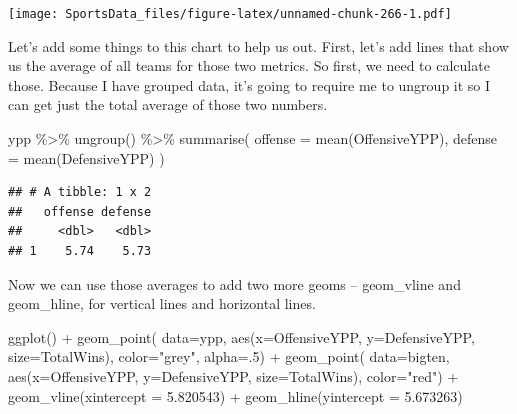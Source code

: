 \documentclass[
]{book}
\newenvironment{Shaded}{\begin{snugshade}}{\end{snugshade}}
\newcommand{\AttributeTok}[1]{\textcolor[rgb]{0.77,0.63,0.00}{#1}}
\newcommand{\DecValTok}[1]{\textcolor[rgb]{0.00,0.00,0.81}{#1}}
\newcommand{\FloatTok}[1]{\textcolor[rgb]{0.00,0.00,0.81}{#1}}
\newcommand{\FunctionTok}[1]{\textcolor[rgb]{0.00,0.00,0.00}{#1}}
\newcommand{\NormalTok}[1]{#1}
\newcommand{\SpecialCharTok}[1]{\textcolor[rgb]{0.00,0.00,0.00}{#1}}
\newcommand{\StringTok}[1]{\textcolor[rgb]{0.31,0.60,0.02}{#1}}
\begin{document}
\texttt{[image: SportsData\_files/figure-latex/unnamed-chunk-266-1.pdf]}

Let's add some things to this chart to help us out. First, let's add lines that show us the average of all teams for those two metrics. So first, we need to calculate those. Because I have grouped data, it's going to require me to ungroup it so I can get just the total average of those two numbers.

\begin{Shaded}
\begin{Highlighting}[]
\NormalTok{ypp }\SpecialCharTok{\%\textgreater{}\%} 
  \FunctionTok{ungroup}\NormalTok{() }\SpecialCharTok{\%\textgreater{}\%} 
  \FunctionTok{summarise}\NormalTok{(}
    \AttributeTok{offense =} \FunctionTok{mean}\NormalTok{(OffensiveYPP), }
    \AttributeTok{defense =} \FunctionTok{mean}\NormalTok{(DefensiveYPP)}
\NormalTok{    )}
\end{Highlighting}
\end{Shaded}

\begin{verbatim}
## # A tibble: 1 x 2
##   offense defense
##     <dbl>   <dbl>
## 1    5.74    5.73
\end{verbatim}

Now we can use those averages to add two more geoms -- geom\_vline and geom\_hline, for vertical lines and horizontal lines.

\begin{Shaded}
\begin{Highlighting}[]
\FunctionTok{ggplot}\NormalTok{() }\SpecialCharTok{+} 
  \FunctionTok{geom\_point}\NormalTok{(}
    \AttributeTok{data=}\NormalTok{ypp, }
    \FunctionTok{aes}\NormalTok{(}\AttributeTok{x=}\NormalTok{OffensiveYPP, }\AttributeTok{y=}\NormalTok{DefensiveYPP, }\AttributeTok{size=}\NormalTok{TotalWins), }
    \AttributeTok{color=}\StringTok{"grey"}\NormalTok{, }
    \AttributeTok{alpha=}\NormalTok{.}\DecValTok{5}\NormalTok{) }\SpecialCharTok{+} 
  \FunctionTok{geom\_point}\NormalTok{(}
    \AttributeTok{data=}\NormalTok{bigten, }
    \FunctionTok{aes}\NormalTok{(}\AttributeTok{x=}\NormalTok{OffensiveYPP, }\AttributeTok{y=}\NormalTok{DefensiveYPP, }\AttributeTok{size=}\NormalTok{TotalWins), }
    \AttributeTok{color=}\StringTok{"red"}\NormalTok{) }\SpecialCharTok{+} 
  \FunctionTok{geom\_vline}\NormalTok{(}\AttributeTok{xintercept =} \FloatTok{5.820543}\NormalTok{) }\SpecialCharTok{+} 
  \FunctionTok{geom\_hline}\NormalTok{(}\AttributeTok{yintercept =} \FloatTok{5.673263}\NormalTok{)}
\end{Highlighting}
\end{Shaded}
\end{document}
